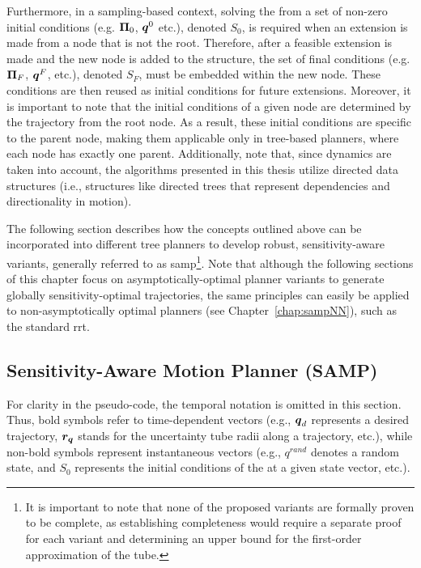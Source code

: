 Furthermore, in a sampling-based context, solving the  from a set of non-zero initial conditions (e.g. $\boldsymbol{\Pi}_0$, $\boldsymbol{q}^0$ etc.), denoted $S_0$, is required when an extension is made from a node that is not the root.
Therefore, after a feasible extension is made and the new node is added to the structure, the set of final conditions (e.g. $\boldsymbol{\Pi}_F$, $\boldsymbol{q}^F$,  etc.), denoted $S_F$, must be embedded within the new node.
These conditions are then reused as initial conditions for future extensions.
Moreover, it is important to note that the initial conditions of a given node are determined by the trajectory from the root node. 
As a result, these initial conditions are specific to the parent node, making them applicable only in tree-based planners, where each node has exactly one parent.
Additionally, note that, since dynamics are taken into account, the algorithms presented in this thesis utilize directed data structures (i.e., structures like directed trees that represent dependencies and directionality in motion).

The following section describes how the concepts outlined above can be incorporated into different tree planners to develop robust, sensitivity-aware variants, generally referred to as \gls{samp}\footnote{It is important to note that none of the proposed variants are formally proven to be complete, as establishing completeness would require a separate proof for each variant and determining an upper bound for the first-order approximation of the tube.}.
Note that although the following sections of this chapter focus on asymptotically-optimal planner variants to generate globally sensitivity-optimal trajectories, the same principles can easily be applied to non-asymptotically optimal planners (see Chapter~\ref{chap:sampNN}), such as the standard \gls{rrt}.
 
\subsection{Sensitivity-Aware Motion Planner (SAMP)}\label{sec:samp}

For clarity in the pseudo-code, the temporal notation is omitted in this section. 
Thus, bold symbols refer to time-dependent vectors (e.g., $\boldsymbol{q}_d$ represents a desired trajectory, $\boldsymbol{r_q}$ stands for the uncertainty tube radii along a trajectory, etc.), while non-bold symbols represent instantaneous vectors (e.g., $q^{rand}$ denotes a random state, and $S_0$ represents the initial conditions of the  at a given state vector, etc.).

